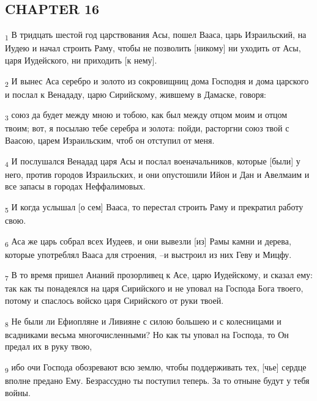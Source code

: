 \subsection{CHAPTER 16}
\begin{tcolorbox}
\textsubscript{1} В тридцать шестой год царствования Асы, пошел Вааса, царь Израильский, на Иудею и начал строить Раму, чтобы не позволить [никому] ни уходить от Асы, царя Иудейского, ни приходить [к нему].
\end{tcolorbox}
\begin{tcolorbox}
\textsubscript{2} И вынес Аса серебро и золото из сокровищниц дома Господня и дома царского и послал к Венададу, царю Сирийскому, жившему в Дамаске, говоря:
\end{tcolorbox}
\begin{tcolorbox}
\textsubscript{3} союз да будет между мною и тобою, как был между отцом моим и отцом твоим; вот, я посылаю тебе серебра и золота: пойди, расторгни союз твой с Ваасою, царем Израильским, чтоб он отступил от меня.
\end{tcolorbox}
\begin{tcolorbox}
\textsubscript{4} И послушался Венадад царя Асы и послал военачальников, которые [были] у него, против городов Израильских, и они опустошили Ийон и Дан и Авелмаим и все запасы в городах Неффалимовых.
\end{tcolorbox}
\begin{tcolorbox}
\textsubscript{5} И когда услышал [о сем] Вааса, то перестал строить Раму и прекратил работу свою.
\end{tcolorbox}
\begin{tcolorbox}
\textsubscript{6} Аса же царь собрал всех Иудеев, и они вывезли [из] Рамы камни и дерева, которые употреблял Вааса для строения, --и выстроил из них Геву и Мицфу.
\end{tcolorbox}
\begin{tcolorbox}
\textsubscript{7} В то время пришел Ананий прозорливец к Асе, царю Иудейскому, и сказал ему: так как ты понадеялся на царя Сирийского и не уповал на Господа Бога твоего, потому и спаслось войско царя Сирийского от руки твоей.
\end{tcolorbox}
\begin{tcolorbox}
\textsubscript{8} Не были ли Ефиопляне и Ливияне с силою большею и с колесницами и всадниками весьма многочисленными? Но как ты уповал на Господа, то Он предал их в руку твою,
\end{tcolorbox}
\begin{tcolorbox}
\textsubscript{9} ибо очи Господа обозревают всю землю, чтобы поддерживать тех, [чье] сердце вполне предано Ему. Безрассудно ты поступил теперь. За то отныне будут у тебя войны.
\end{tcolorbox}
